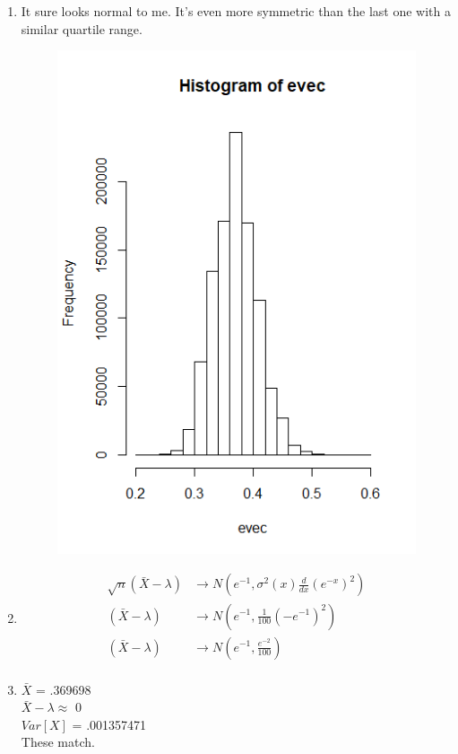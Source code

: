\documentclass{article}
\begin{document}
\begin{enumerate}
\begin{enumerate}
	\item
		It sure looks normal to me. It's even more symmetric than the last one with a similar quartile range. 
		\begin{figure}[H]
		\includegraphics{evec.png}
		\end{figure}
	\item
		\begin{equation*}
		\begin{split}
		\sqrt{n}(\bar{X} - \lambda) &\rightarrow N(e^{-1},\sigma^{2}(x)\frac{d}{dx}(e^{-x})^{2}) \\
		(\bar{X} - \lambda) &\rightarrow N(e^{-1},\frac{1}{100}(-e^{-1})^{2}) \\
		(\bar{X} - \lambda) &\rightarrow N(e^{-1},\frac{e^{-2}}{100}) \\
		\end{split}
		\end{equation*}
	\item
		$\bar{X}$ = .369698 \\
		$\bar{X} - \lambda \approx$ 0 \\
		$Var[X]$ = .001357471 \\
		These match.
	\end{enumerate}
\end{enumerate}
\end{document}
